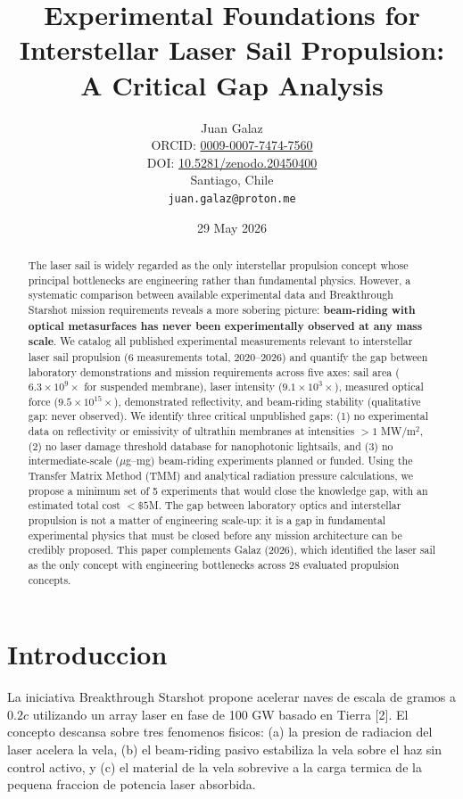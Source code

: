 \documentclass[11pt,a4paper,onecolumn]{article}
\title{{\bfseries Experimental Foundations for Interstellar Laser Sail Propulsion: A Critical Gap Analysis}}
\author{Juan Galaz\\[2mm]
\small ORCID: \href{https://orcid.org/0009-0007-7474-7560}{0009-0007-7474-7560}\\
\small DOI: \href{https://doi.org/10.5281/zenodo.20450400}{10.5281/zenodo.20450400}\\
\small Santiago, Chile\\
\small \texttt{juan.galaz@proton.me}}
\date{29 May 2026}
\begin{document}
\maketitle

\begin{abstract}
The laser sail is widely regarded as the only interstellar propulsion concept whose principal bottlenecks are engineering rather than fundamental physics. However, a systematic comparison between available experimental data and Breakthrough Starshot mission requirements reveals a more sobering picture: \textbf{beam-riding with optical metasurfaces has never been experimentally observed at any mass scale}. We catalog all published experimental measurements relevant to interstellar laser sail propulsion (6 measurements total, 2020--2026) and quantify the gap between laboratory demonstrations and mission requirements across five axes: sail area ($6.3\times10^{9}\times$ for suspended membrane), laser intensity ($9.1\times10^{3}\times$), measured optical force ($9.5\times10^{15}\times$), demonstrated reflectivity, and beam-riding stability (qualitative gap: never observed). We identify three critical unpublished gaps: (1) no experimental data on reflectivity or emissivity of ultrathin membranes at intensities $>1$ MW/m$^2$, (2) no laser damage threshold database for nanophotonic lightsails, and (3) no intermediate-scale ($\mu$g--mg) beam-riding experiments planned or funded. Using the Transfer Matrix Method (TMM) and analytical radiation pressure calculations, we propose a minimum set of 5 experiments that would close the knowledge gap, with an estimated total cost $<\$5$M. The gap between laboratory optics and interstellar propulsion is not a matter of engineering scale-up: it is a gap in fundamental experimental physics that must be closed before any mission architecture can be credibly proposed. This paper complements Galaz (2026), which identified the laser sail as the only concept with engineering bottlenecks across 28 evaluated propulsion concepts.
\end{abstract}

\vspace{5mm}

\section{Introduccion}

La iniciativa Breakthrough Starshot propone acelerar naves de escala de gramos a $0.2c$ utilizando un array laser en fase de 100 GW basado en Tierra [2]. El concepto descansa sobre tres fenomenos fisicos: (a) la presion de radiacion del laser acelera la vela, (b) el beam-riding pasivo estabiliza la vela sobre el haz sin control activo, y (c) el material de la vela sobrevive a la carga termica de la pequena fraccion de potencia laser absorbida.
\end{document}
